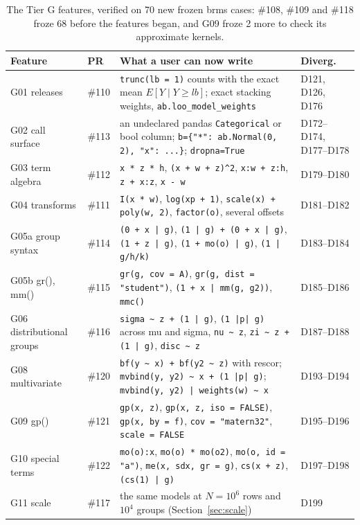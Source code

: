 \documentclass[11pt]{article}
\newcommand{\code}[1]{\texttt{#1}}
\begin{document}
\begin{table}[tbp]
\small
\begin{center}\begin{tabular}{@{}>{\raggedright\arraybackslash}p{}>{\raggedright\arraybackslash}p{}>{\raggedright\arraybackslash}p{}>{\raggedright\arraybackslash}p{}@{}}
\toprule
Feature & PR & What a user can now write & Diverg. \\
\midrule
G01 releases & \#110 & \code{trunc(lb = 1)} counts with the exact mean $E[Y \mid Y \ge lb]$; exact stacking weights, \code{ab.loo\_model\_weights} & D121, D126, D176 \\
G02 call surface & \#113 & an undeclared pandas \code{Categorical} or bool column; \code{b=\{"*": ab.Normal(0, 2), "x": ...\}}; \code{dropna=True} & D172--D174, D177--D178 \\
G03 term algebra & \#112 & \code{x * z * h}, \code{(x + w + z)\^{}2}, \code{x:w + z:h}, \code{z + x:z}, \code{x - w} & D179--D180 \\
G04 transforms & \#111 & \code{I(x * w)}, \code{log(xp + 1)}, \code{scale(x) + poly(w, 2)}, \code{factor(o)}, several offsets & D181--D182 \\
G05a group syntax & \#114 & \code{(0 + x | g)}, \code{(1 | g) + (0 + x | g)}, \code{(1 + z | g)}, \code{(1 + mo(o) | g)}, \code{(1 | g/h/k)} & D183--D184 \\
G05b gr(), mm() & \#115 & \code{gr(g, cov = A)}, \code{gr(g, dist = "student")}, \code{(1 + x | mm(g, g2))}, \code{mmc()} & D185--D186 \\
G06 distributional groups & \#116 & \code{sigma \textasciitilde{} z + (1 | g)}, \code{(1 |p| g)} across mu and sigma, \code{nu \textasciitilde{} z}, \code{zi \textasciitilde{} z + (1 | g)}, \code{disc \textasciitilde{} z} & D187--D188 \\
G08 multivariate & \#120 & \code{bf(y \textasciitilde{} x) + bf(y2 \textasciitilde{} z)} with rescor; \code{mvbind(y, y2) \textasciitilde{} x + (1 |p| g)}; \code{mvbind(y, y2) | weights(w) \textasciitilde{} x} & D193--D194 \\
G09 gp() & \#121 & \code{gp(x, z)}, \code{gp(x, z, iso = FALSE)}, \code{gp(x, by = f)}, \code{cov = "matern32"}, \code{scale = FALSE} & D195--D196 \\
G10 special terms & \#122 & \code{mo(o):x}, \code{mo(o) * mo(o2)}, \code{mo(o, id = "a")}, \code{me(x, sdx, gr = g)}, \code{cs(x + z)}, \code{(cs(1) | g)} & D197--D198 \\
G11 scale & \#117 & the same models at $N = 10^6$ rows and $10^4$ groups (Section~\ref{sec:scale}) & D199 \\
\bottomrule
\end{tabular}\end{center}
\caption{\small The Tier G features, verified on 70 new frozen brms cases: \#108, \#109 and \#118 froze 68 before the
features began, and G09 froze 2 more to check its approximate kernels.}\label{tab:built}
\end{table}
\end{document}
